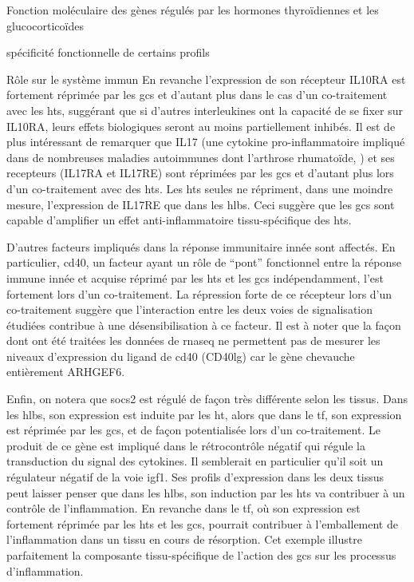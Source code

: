 \documentclass[../main.tex]{subfiles}
\begin{document}
\begin{chapter}{Fonction moléculaire des gènes régulés par les hormones thyroïdiennes et les glucocorticoïdes}
\begin{section}{spécificité fonctionnelle de certains profils}
\begin{subsection}{Rôle sur le système immun}
En revanche l'expression de son récepteur IL10RA est fortement réprimée par les \glspl{gc} et d'autant plus dans le cas d'un co-traitement avec les \glspl{ht}, suggérant que si d'autres interleukines ont la capacité de se fixer sur IL10RA, leurs effets biologiques seront au moins partiellement inhibés.
Il est de plus intéressant de remarquer que IL17 (une cytokine pro-inflammatoire impliqué dans de nombreuses maladies autoimmunes dont l'arthrose rhumatoïde, \citealp{Onishi2010}) et ses recepteurs (IL17RA et IL17RE) sont réprimées par les \glspl{gc} et d'autant plus lors d'un co-traitement avec des \glspl{ht}.
Les \glspl{ht} seules ne répriment, dans une moindre mesure, l'expression de IL17RE que dans les \glspl{hlb}.
Ceci suggère que les \glspl{gc} sont capable d'amplifier un effet anti-inflammatoire tissu-spécifique des \glspl{ht}.
\par
D'autres facteurs impliqués dans la réponse immunitaire innée sont affectés.
En particulier, \gls{cd40}, un facteur ayant un rôle de ``pont'' fonctionnel entre la réponse immune innée et acquise \citep{Elgueta2009,Fujii2004} réprimé par les \glspl{ht} et les \glspl{gc} indépendamment, l'est fortement lors d'un co-traitement.
La répression forte de ce récepteur lors d'un co-traitement suggère que l'interaction entre les deux voies de signalisation étudiées contribue à une désensibilisation à ce facteur.
Il est à noter que la façon dont ont été traitées les données de \gls{rnaseq} ne permettent pas de mesurer les niveaux d'expression du ligand de \gls{cd40} (CD40lg) car le gène chevauche entièrement ARHGEF6.
\par
Enfin, on notera que \gls{socs2} est régulé de façon très différente selon les tissus.
Dans les \glspl{hlb}, son expression est induite par les \gls{ht}, alors que dans le \gls{tf}, son expression est réprimée par les \glspl{gc}, et de façon potentialisée lors d'un co-traitement.
Le produit de ce gène est impliqué dans le rétrocontrôle négatif qui régule la transduction du signal des cytokines.
Il semblerait en particulier qu'il soit un régulateur négatif de la voie \gls{igf}1.
Ses profils d'expression dans les deux tissus peut laisser penser que dans les \glspl{hlb}, son induction par les \glspl{ht} va contribuer à un contrôle de l'inflammation.
En revanche dans le \gls{tf}, où son expression est fortement réprimée par les \glspl{ht} et les \glspl{gc}, pourrait contribuer à l'emballement de l'inflammation dans un tissu en cours de résorption.
Cet exemple illustre parfaitement la composante tissu-spécifique de l'action des \glspl{gc} sur les processus d'inflammation.
\end{subsection}



\end{section}
\end{chapter}
\end{document}
